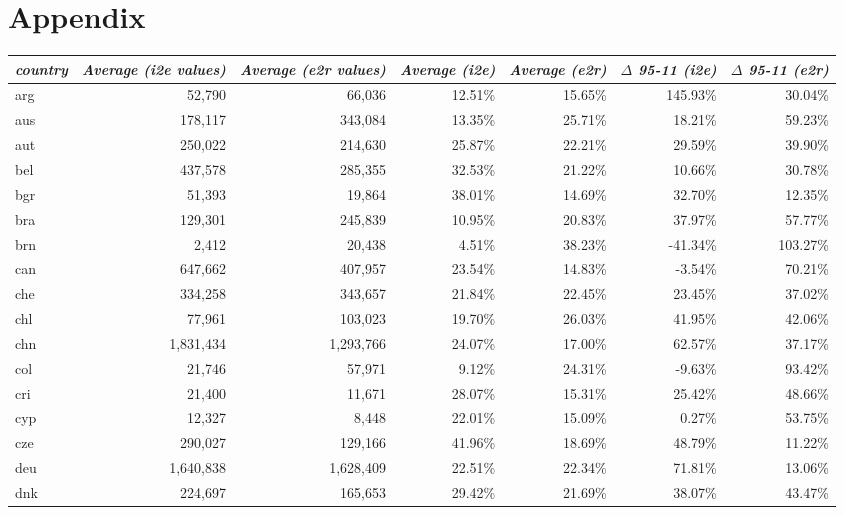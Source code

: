 \documentclass[11pt,a4paper]{article}
\begin{document}
\section{Appendix}
\begin{table}[h]\small
  \centering
   \hspace*{-2.8cm}
    \begin{tabular}{lrrrrrr}
    \toprule
    \multicolumn{1}{l}{\textit{country}} & \multicolumn{1}{c}{\textit{Average (i2e values)}} & \multicolumn{1}{c}{\textit{Average (e2r values)}} & \multicolumn{1}{c}{\textit{Average (i2e)}} & \multicolumn{1}{c}{\textit{Average (e2r)}} & \multicolumn{1}{c}{\textit{$\Delta$ 95-11 (i2e)}} & \multicolumn{1}{c}{\textit{$\Delta$ 95-11  (e2r)}} \\
    \midrule
    arg   & 52,790 & 66,036 & 12.51\% & 15.65\% & 145.93\% & 30.04\% \\
    aus   & 178,117 & 343,084 & 13.35\% & 25.71\% & 18.21\% & 59.23\% \\
    aut   & 250,022 & 214,630 & 25.87\% & 22.21\% & 29.59\% & 39.90\% \\
    bel   & 437,578 & 285,355 & 32.53\% & 21.22\% & 10.66\% & 30.78\% \\
    bgr   & 51,393 & 19,864 & 38.01\% & 14.69\% & 32.70\% & 12.35\% \\
    bra   & 129,301 & 245,839 & 10.95\% & 20.83\% & 37.97\% & 57.77\% \\
    brn   & 2,412 & 20,438 & 4.51\% & 38.23\% & -41.34\% & 103.27\% \\
    can   & 647,662 & 407,957 & 23.54\% & 14.83\% & -3.54\% & 70.21\% \\
    che   & 334,258 & 343,657 & 21.84\% & 22.45\% & 23.45\% & 37.02\% \\
    chl   & 77,961 & 103,023 & 19.70\% & 26.03\% & 41.95\% & 42.06\% \\
    chn   & 1,831,434 & 1,293,766 & 24.07\% & 17.00\% & 62.57\% & 37.17\% \\
    col   & 21,746 & 57,971 & 9.12\% & 24.31\% & -9.63\% & 93.42\% \\
    cri   & 21,400 & 11,671 & 28.07\% & 15.31\% & 25.42\% & 48.66\% \\
    cyp   & 12,327 & 8,448 & 22.01\% & 15.09\% & 0.27\% & 53.75\% \\
    cze   & 290,027 & 129,166 & 41.96\% & 18.69\% & 48.79\% & 11.22\% \\
    deu   & 1,640,838 & 1,628,409 & 22.51\% & 22.34\% & 71.81\% & 13.06\% \\
    dnk   & 224,697 & 165,653 & 29.42\% & 21.69\% & 38.07\% & 43.47\% \\

\end{tabular}
\end{table}
\end{document}
